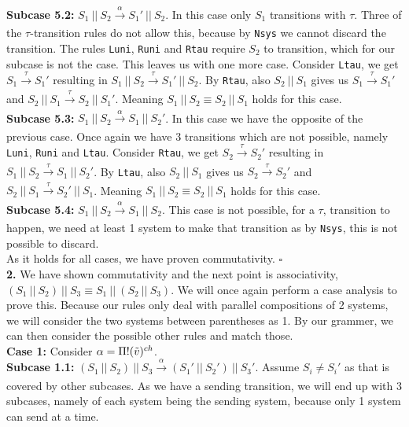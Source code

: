 \indent \textbf{Subcase 5.2: }$S_1 \ || \ S_2 \xrightarrow[]{\alpha} S_1' \ || \ S_2$. In this case only $S_1$ transitions with $\tau$. Three of the $\tau$-transition rules do not allow this, because by \texttt{Nsys} we cannot discard the transition. The rules \texttt{Luni}, \texttt{Runi} and \texttt{Rtau} require $S_2$ to transition, which for our subcase is not the case. This leaves us with one more case. Consider \texttt{Ltau}, we get $S_1 \xrightarrow[]{\tau} S_1'$ resulting in $S_1 \ || \ S_2 \xrightarrow[]{\tau} S_1' \ || \ S_2$. By \texttt{Rtau}, also $S_2\ ||\ S_1$ gives us $S_1 \xrightarrow[]{\tau} S_1'$ and $S_2 \ || \ S_1 \xrightarrow[]{\tau} S_2 \ || \ S_1'$. Meaning $S_1 \ || \ S_2 \equiv S_2\ ||\ S_1$ holds for this case.\\ 
\indent \textbf{Subcase 5.3: }$S_1 \ || \ S_2 \xrightarrow[]{\alpha} S_1 \ || \ S_2'$. In this case we have the opposite of the previous case. Once again we have 3 transitions which are not possible, namely \texttt{Luni}, \texttt{Runi} and \texttt{Ltau}. Consider \texttt{Rtau}, we get $S_2 \xrightarrow[]{\tau} S_2'$ resulting in $S_1 \ || \ S_2 \xrightarrow[]{\tau} S_1 \ || \ S_2'$. By \texttt{Ltau}, also $S_2\ ||\ S_1$ gives us $S_2 \xrightarrow[]{\tau} S_2'$ and $S_2 \ || \ S_1 \xrightarrow[]{\tau} S_2' \ || \ S_1$. Meaning $S_1 \ || \ S_2 \equiv S_2\ ||\ S_1$ holds for this case.\\
\indent \textbf{Subcase 5.4:} $S_1 \ || \ S_2 \xrightarrow[]{\alpha} S_1 \ || \ S_2$. This case is not possible, for a $\tau$, transition to happen, we need at least 1 system to make that transition as by \texttt{Nsys}, this is not possible to discard.\\
As it holds for all cases, we have proven commutativity. $\square$
\\
\textbf{2. }We have shown commutativity and the next point is associativity, $(S_1 \ ||\ S_2 )\ || \ S_3 \equiv S_1 \ ||\ (S_2 \ || \ S_3)$. We will once again perform a case analysis to prove this. Because our rules only deal with parallel compositions of 2 systems, we will consider the two systems between parentheses as 1. By our grammer, we can then consider the possible other rules and match those.\\
\textbf{Case 1: } Consider $\alpha = \Pi ! (\Tilde{v})^{ch}$.\\
\indent \textbf{Subcase 1.1: }$(S_1 \ || \ S_2)\ ||\ S_3 \xrightarrow[]{\alpha} (S_1' \ || \ S_2')\ ||\ S_3'$. Assume $S_i\not = S_i'$ as that is covered by other subcases. As we have a sending transition, we will end up with 3 subcases, namely of each system being the sending system, because only 1 system can send at a time.\\
